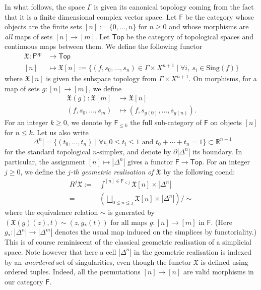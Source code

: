 \documentclass[a4paper]{amsart}
\newcommand{\bR}{\mathbb R}
\newcommand{\fX}{\mathfrak X}
\newcommand{\lra}{\longrightarrow}
\newcommand{\op}{\text{op}}
\theoremstyle{plain}
\theoremstyle{definition}
\newcommand{\catTop}{\mathsf{Top}}
\newcommand{\catF}{\mathsf{F}}
\begin{document}
\bigskip

In what follows, the space $\Gamma$ is given its canonical topology coming from the fact that it is a finite dimensional complex vector space. Let $\catF$ be the category whose objects are the finite sets $[n] := \{0,\ldots,n\}$ for $n \geq 0$ and whose morphisms are \emph{all} maps of sets $[n] \to [m]$. Let $\catTop$ be the category of topological spaces and continuous maps between them. We define the following functor
\begin{equation}\label{eqn:defoffunctorX}
\begin{split}
    \fX \colon \catF^\op &\lra \catTop \\
                [n] &\longmapsto \fX[n] := \{(f,s_0,\ldots,s_n) \in \Gamma \times X^{n+1} \mid \forall i, \ s_i \in \mathrm{Sing}(f) \}
\end{split}
\end{equation}
where $\fX[n]$ is given the subspace topology from $\Gamma \times X^{n+1}$. On morphisms, for a map of sets $g \colon [n] \to [m]$, we define 
\begin{equation*}
\begin{split}
    \fX(g) \colon \fX[m] &\lra \fX[n] \\
            (f,s_0,\ldots,s_m) &\longmapsto (f,s_{g(0)}, \ldots, s_{g(n)}).
\end{split}
\end{equation*}
For an integer $k \geq 0$, we denote by $\catF_{\leq k}$ the full sub-category of $\catF$ on objects $[n]$ for $n \leq k$. Let us also write 
\[
    |\Delta^n| = \{ (t_0, \ldots, t_n) \mid \forall i, 0 \leq t_i \leq 1 \text{ and } t_0 + \cdots + t_n = 1 \} \subset \bR^{n+1}
\]
for the standard topological $n$-simplex, and denote by $\partial |\Delta^n|$ its boundary. In particular, the assignment $[n] \mapsto |\Delta^n|$ gives a functor $\catF \to \catTop$. For an integer $j \geq 0$, we define the \emph{$j$-th geometric realisation of $\fX$} by the following coend:
\begin{equation}\label{eqn:jthgeometricrealisationcoend}
\begin{split}
    R^j\fX :=& \int^{[n] \in \catF_{\leq j}} \fX[n] \times |\Delta^n| \\
            =& \left( \bigsqcup_{0 \leq n \leq j} \fX[n] \times |\Delta^n| \right) / \sim
\end{split}
\end{equation}
where the equivalence relation $\sim$ is generated by $(\fX(g)(z),t) \sim (z,g_*(t))$ for all maps $g \colon [n] \to [m]$ in $\catF$. (Here $g_* \colon |\Delta^n| \to |\Delta^m|$ denotes the usual map induced on the simplices by functoriality.) This is of course reminiscent of the classical geometric realisation of a simplicial space. Note however that here a cell $|\Delta^n|$ in the geometric realisation is indexed by an \emph{unordered} set of singularities, even though the functor $\fX$ is defined using ordered tuples. Indeed, all the permutations $[n] \to [n]$ are valid morphisms in our category $\catF$.
\end{document}
